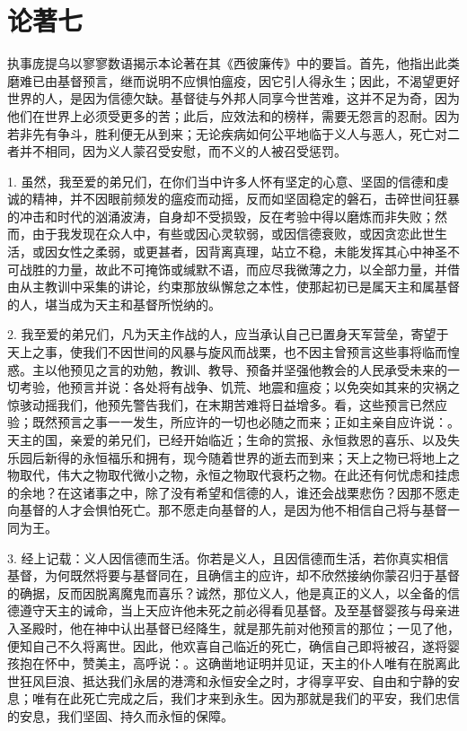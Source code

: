 
\section{论著七}

执事庞提乌以寥寥数语揭示本论著在其《西彼廉传》中的要旨。首先，他指出此类磨难已由基督预言，继而说明不应惧怕瘟疫，因它引人得永生；因此，不渴望更好世界的人，是因为信德欠缺。基督徒与外邦人同享今世苦难，这并不足为奇，因为他们在世界上必须受更多的苦；此后，应效法和的榜样，需要无怨言的忍耐。因为若非先有争斗，胜利便无从到来；无论疾病如何公平地临于义人与恶人，死亡对二者并不相同，因为义人蒙召受安慰，而不义的人被召受惩罚。\par

1. 虽然，我至爱的弟兄们，在你们当中许多人怀有坚定的心意、坚固的信德和虔诚的精神，并不因眼前频发的瘟疫而动摇，反而如坚固稳定的磐石，击碎世间狂暴的冲击和时代的汹涌波涛，自身却不受损毁，反在考验中得以磨炼而非失败；然而，由于我发现在众人中，有些或因心灵软弱，或因信德衰败，或因贪恋此世生活，或因女性之柔弱，或更甚者，因背离真理，站立不稳，未能发挥其心中神圣不可战胜的力量，故此不可掩饰或缄默不语，而应尽我微薄之力，以全部力量，并借由从主教训中采集的讲论，约束那放纵懈怠之本性，使那起初已是属天主和属基督的人，堪当成为天主和基督所悦纳的。\par

2. 我至爱的弟兄们，凡为天主作战的人，应当承认自己已置身天军营垒，寄望于天上之事，使我们不因世间的风暴与旋风而战栗，也不因主曾预言这些事将临而惶惑。主以他预见之言的劝勉，教训、教导、预备并坚强他教会的人民承受未来的一切考验，他预言并说：各处将有战争、饥荒、地震和瘟疫；以免突如其来的灾祸之惊骇动摇我们，他预先警告我们，在末期苦难将日益增多。看，这些预言已然应验；既然预言之事一一发生，所应许的一切也必随之而来；正如主亲自应许说：。天主的国，亲爱的弟兄们，已经开始临近；生命的赏报、永恒救恩的喜乐、以及失乐园后新得的永恒福乐和拥有，现今随着世界的逝去而到来；天上之物已将地上之物取代，伟大之物取代微小之物，永恒之物取代衰朽之物。在此还有何忧虑和挂虑的余地？在这诸事之中，除了没有希望和信德的人，谁还会战栗悲伤？因那不愿走向基督的人才会惧怕死亡。那不愿走向基督的人，是因为他不相信自己将与基督一同为王。\par

3. 经上记载：义人因信德而生活。你若是义人，且因信德而生活，若你真实相信基督，为何既然将要与基督同在，且确信主的应许，却不欣然接纳你蒙召归于基督的确据，反而因脱离魔鬼而喜乐？诚然，那位义人，他是真正的义人，以全备的信德遵守天主的诫命，当上天应许他未死之前必得看见基督。及至基督婴孩与母亲进入圣殿时，他在神中认出基督已经降生，就是那先前对他预言的那位；一见了他，便知自己不久将离世。因此，他欢喜自己临近的死亡，确信自己即将被召，遂将婴孩抱在怀中，赞美主，高呼说：。这确凿地证明并见证，天主的仆人唯有在脱离此世狂风巨浪、抵达我们永居的港湾和永恒安全之时，才得享平安、自由和宁静的安息；唯有在此死亡完成之后，我们才来到永生。因为那就是我们的平安，我们忠信的安息，我们坚固、持久而永恒的保障。\par


